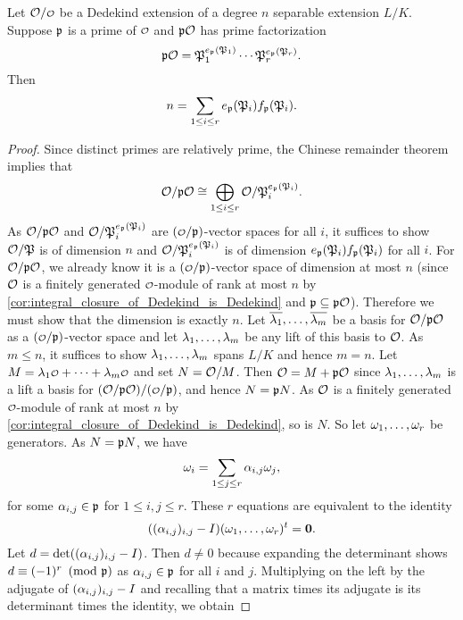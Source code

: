     \begin{theorem*}
      Let $\mc{O}/\smc{O}$ be a Dedekind extension of a degree $n$ separable extension $L/K$. Suppose $\mathfrak{p}$ is a prime of $\smc{O}$ and $\mathfrak{p}\mathcal{O}$ has prime factorization
      \[
        \mathfrak{p}\mathcal{O} = \mathfrak{P}_{1}^{e_{\mathfrak{p}}(\mathfrak{P}_{1})} \cdots \mathfrak{P}_{r}^{e_{\mathfrak{p}}(\mathfrak{P}_{r})}.
      \]
      Then
      \[
        n = \sum_{1 \le i \le r}e_{\mathfrak{p}}(\mathfrak{P}_{i})f_{\mathfrak{p}}(\mathfrak{P}_{i}).
      \]
    \end{theorem*}
    \begin{proof}
      Since distinct primes are relatively prime, the Chinese remainder theorem implies that
      \[
        \mathcal{O}/\mathfrak{p}\mathcal{O} \cong \bigoplus_{1 \le i \le r} \mathcal{O}/\mathfrak{P}_{i}^{e_{\mathfrak{p}}(\mathfrak{P}_{i})}.
      \]
      As $\mathcal{O}/\mathfrak{p}\mathcal{O}$ and $\mathcal{O}/\mathfrak{P}_{i}^{e_{\mathfrak{p}}(\mathfrak{P}_{i})}$ are $(\smc{O}/\mf{p})$-vector spaces for all $i$, it suffices to show $\mathcal{O}/\mathfrak{P}$ is of dimension $n$ and $\mathcal{O}/\mathfrak{P}_{i}^{e_{\mathfrak{p}}(\mathfrak{P}_{i})}$ is of dimension $e_{\mathfrak{p}}(\mathfrak{P}_{i})f_{\mathfrak{p}}(\mathfrak{P}_{i})$ for all $i$. For $\mathcal{O}/\mathfrak{p}\mathcal{O}$, we already know it is a $(\smc{O}/\mf{p})$-vector space of dimension at most $n$ (since $\mathcal{O}$ is a finitely generated $\smc{O}$-module of rank at most $n$ by \cref{cor:integral_closure_of_Dedekind_is_Dedekind} and $\mathfrak{p} \subseteq \mathfrak{p}\mathcal{O}$). Therefore we must show that the dimension is exactly $n$. Let $\overline{\lambda_{1}},\ldots,\overline{\lambda_{m}}$ be a basis for $\mathcal{O}/\mathfrak{p}\mathcal{O}$ as a $(\smc{O}/\mf{p})$-vector space and let $\lambda_{1},\ldots,\lambda_{m}$ be any lift of this basis to $\mathcal{O}$. As $m \le n$, it suffices to show $\lambda_{1},\ldots,\lambda_{m}$ spans $L/K$ and hence $m = n$. Let $M = \l_{1}\smc{O}+\cdots+\l_{m}\smc{O}$ and set $N = \mathcal{O}/M$. Then $\mathcal{O} = M+\mathfrak{p}\mathcal{O}$ since $\lambda_{1},\ldots,\lambda_{m}$ is a lift a basis for $(\mc{O}/\mf{p}\mc{O})/(\smc{O}/\mf{p})$, and hence $N = \mathfrak{p}N$. As $\mathcal{O}$ is a finitely generated $\smc{O}$-module of rank at most $n$ by \cref{cor:integral_closure_of_Dedekind_is_Dedekind}, so is $N$. So let $\omega_{1},\ldots,\omega_{r}$ be generators. As $N = \mathfrak{p}N$, we have
      \[
        \omega_{i} = \sum_{1 \le j \le r}\alpha_{i,j}\omega_{j},
      \]
      for some $\alpha_{i,j} \in \mathfrak{p}$ for $1 \le i,j \le r$. These $r$ equations are equivalent to the identity
      \[
        ((\alpha_{i,j})_{i,j}-I)(\omega_{1},\ldots,\omega_{r})^{t} = \mathbf{0}.
      \]
      Let $d = \det((\alpha_{i,j})_{i,j}-I)$. Then $d \neq 0$ because expanding the determinant shows $d \equiv (-1)^{r} \ \left(\text{mod }\mathfrak{p}\right)$ as $\alpha_{i,j} \in \mathfrak{p}$ for all $i$ and $j$. Multiplying on the left by the adjugate of $(\alpha_{i,j})_{i,j}-I$ and recalling that a matrix times its adjugate is its determinant times the identity, we obtain

\end{proof}
